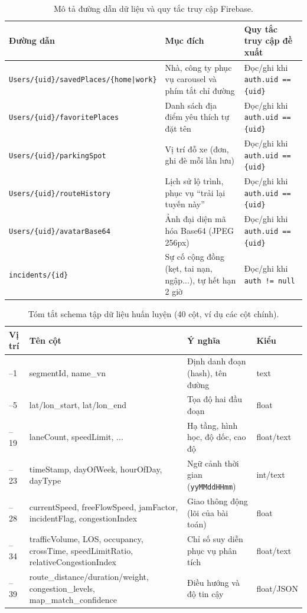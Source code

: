\begin{table}[h!]
\centering
\caption{Mô tả đường dẫn dữ liệu và quy tắc truy cập Firebase.}
\label{tab:fbrules}
\small
\begin{tabularx}{\textwidth}{lXX}
\toprule
\textbf{Đường dẫn} & \textbf{Mục đích} & \textbf{Quy tắc truy cập đề xuất}\\
\midrule
\texttt{Users/\{uid\}/savedPlaces/\{home|work\}} & Nhà, công ty phục vụ carousel và phím tắt chỉ đường & Đọc/ghi khi \texttt{auth.uid == \{uid\}}\\
\texttt{Users/\{uid\}/favoritePlaces} & Danh sách địa điểm yêu thích tự đặt tên & Đọc/ghi khi \texttt{auth.uid == \{uid\}}\\
\texttt{Users/\{uid\}/parkingSpot} & Vị trí đỗ xe (đơn, ghi đè mỗi lần lưu) & Đọc/ghi khi \texttt{auth.uid == \{uid\}}\\
\texttt{Users/\{uid\}/routeHistory} & Lịch sử lộ trình, phục vụ ``trải lại tuyến này'' & Đọc/ghi khi \texttt{auth.uid == \{uid\}}\\
\texttt{Users/\{uid\}/avatarBase64} & Ảnh đại diện mã hóa Base64 (JPEG 256px) & Đọc/ghi khi \texttt{auth.uid == \{uid\}}\\
\texttt{incidents/\{id\}} & Sự cố cộng đồng (kẹt, tai nạn, ngập...), tự hết hạn 2 giờ & Đọc/ghi khi \texttt{auth != null}\\
\bottomrule
\end{tabularx}
\end{table}

\begin{table}[h!]
\centering
\caption{Tóm tắt schema tập dữ liệu huấn luyện (40 cột, ví dụ các cột chính).}
\label{tab:schema}
\small
\begin{tabularx}{\textwidth}{>{\raggedright\arraybackslash}p{1.1cm}>{\raggedright\arraybackslash}p{4.4cm}X>{\raggedright\arraybackslash}p{1.7cm}}
\toprule
\textbf{Vị trí} & \textbf{Tên cột} & \textbf{Ý nghĩa} & \textbf{Kiểu}\\
\midrule
0--1 & segmentId, name\_vn & Định danh đoạn (hash), tên đường & text\\
2--5 & lat/lon\_start, lat/lon\_end & Tọa độ hai đầu đoạn & float\\
6--19 & laneCount, speedLimit, ... & Hạ tầng, hình học, độ dốc, cao độ & float/text\\
20--23 & timeStamp, dayOfWeek, hourOfDay, dayType & Ngữ cảnh thời gian (\texttt{yyMMddHHmm}) & int/text\\
24--28 & currentSpeed, freeFlowSpeed, jamFactor, incidentFlag, congestionIndex & Giao thông động (lõi của bài toán) & float\\
29--34 & trafficVolume, LOS, occupancy, crossTime, speedLimitRatio, relativeCongestionIndex & Chỉ số suy diễn phục vụ phân tích & float/text\\
35--39 & route\_distance/duration/weight, congestion\_levels, map\_match\_confidence & Điều hướng và độ tin cậy & float/JSON\\
\bottomrule
\end{tabularx}
\end{table}

